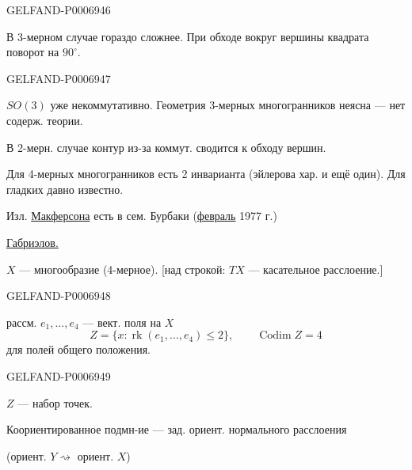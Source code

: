 \begin{GelfandAdjacentEvidence}{GELFAND-P000694}{6}


В 3-мерном случае гораздо сложнее. При обходе вокруг вершины квадрата поворот на \(90^\circ\).

\end{GelfandAdjacentEvidence}
\begin{GelfandAdjacentEvidence}{GELFAND-P000694}{7}


\(SO(3)\) уже некоммутативно. Геометрия 3-мерных многогранников неясна --- нет содерж. теории.

В 2-мерн. случае контур из-за коммут. сводится к обходу вершин.

Для 4-мерных многогранников есть 2 инварианта (эйлерова хар. и ещё один). Для гладких давно известно.

Изл. \underline{Макферсона} есть в сем. Бурбаки (\underline{февраль} 1977 г.)

\underline{Габриэлов.}

\(X\) --- многообразие (4-мерное).
[над строкой: \(TX\) --- касательное расслоение.]
\end{GelfandAdjacentEvidence}
\begin{GelfandAdjacentEvidence}{GELFAND-P000694}{8}

рассм. \(e_1,\ldots,e_4\) --- вект. поля на \(X\)
\[
Z=\{x:\operatorname{rk}(e_1,\ldots,e_4)\leq 2\},\qquad\operatorname{Codim}Z=4
\]
для полей общего положения.
\end{GelfandAdjacentEvidence}
\begin{GelfandAdjacentEvidence}{GELFAND-P000694}{9}


\(Z\) --- набор точек.

Коориентированное подмн-ие --- зад. ориент. нормального расслоения

(ориент. \(Y\rightsquigarrow\) ориент. \(X\))
\end{GelfandAdjacentEvidence}




